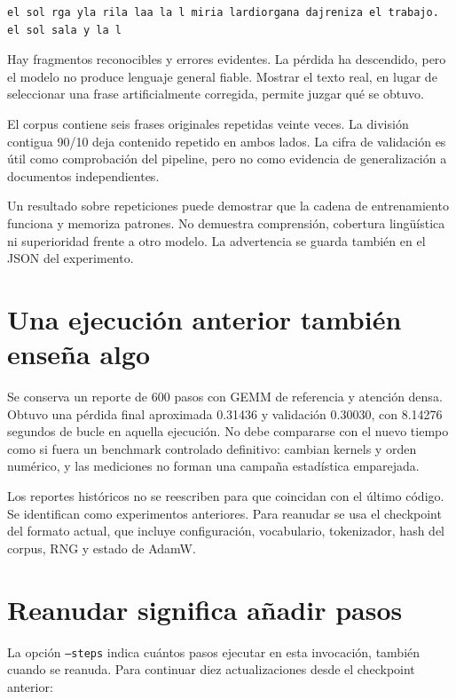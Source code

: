 \documentclass[12pt,a4paper,oneside]{report}
\begin{document}
\begin{lstlisting}
el sol rga yla rila laa la l miria lardiorgana dajreniza el trabajo.
el sol sala y la l
\end{lstlisting}
Hay fragmentos reconocibles y errores evidentes. La pérdida ha descendido, pero el modelo no produce lenguaje general fiable. Mostrar el texto real, en lugar de seleccionar una frase artificialmente corregida, permite juzgar qué se obtuvo.

El corpus contiene seis frases originales repetidas veinte veces. La división contigua 90/10 deja contenido repetido en ambos lados. La cifra de validación es útil como comprobación del pipeline, pero no como evidencia de generalización a documentos independientes.

\begin{cuidado}
Un resultado sobre repeticiones puede demostrar que la cadena de entrenamiento funciona y memoriza patrones. No demuestra comprensión, cobertura lingüística ni superioridad frente a otro modelo. La advertencia se guarda también en el JSON del experimento.

\end{cuidado}
\section{Una ejecución anterior también enseña algo}
Se conserva un reporte de 600 pasos con GEMM de referencia y atención densa. Obtuvo una pérdida final aproximada 0.31436 y validación 0.30030, con 8.14276 segundos de bucle en aquella ejecución. No debe compararse con el nuevo tiempo como si fuera un benchmark controlado definitivo: cambian kernels y orden numérico, y las mediciones no forman una campaña estadística emparejada.

Los reportes históricos no se reescriben para que coincidan con el último código. Se identifican como experimentos anteriores. Para reanudar se usa el checkpoint del formato actual, que incluye configuración, vocabulario, tokenizador, hash del corpus, RNG y estado de AdamW.

\section{Reanudar significa añadir pasos}
La opción \texttt{--steps} indica cuántos pasos ejecutar en esta invocación, también cuando se reanuda. Para continuar diez actualizaciones desde el checkpoint anterior:
\end{document}
